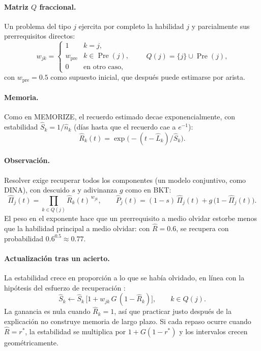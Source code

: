 \documentclass[runningheads]{llncs}
\newcommand{\Pre}{\operatorname{Pre}}
\newcommand{\Rh}{\hat R}
\newcommand{\Sh}{\hat S}
\newcommand{\Lh}{\hat L}
\newcommand{\Pih}{\hat\Pi}
\newcommand{\rstar}{r^{\ast}}
\begin{document}
\paragraph{Matriz $Q$ fraccional.} Un problema del tipo $j$ ejercita por completo la habilidad $j$ y parcialmente sus prerrequisitos directos:
\begin{equation}
w_{jk}=\begin{cases}1 & k=j,\\ w_{\mathrm{pre}} & k\in\Pre(j),\\ 0 & \text{en otro caso,}\end{cases}
\qquad Q(j)=\{j\}\cup\Pre(j),
\label{eq:w}
\end{equation}
con $w_{\mathrm{pre}}=0.5$ como supuesto inicial, que después puede estimarse por arista.

\paragraph{Memoria.} Como en MEMORIZE, el recuerdo estimado decae exponencialmente, con estabilidad $\Sh_k=1/\hat n_k$ (días hasta que el recuerdo cae a $e^{-1}$):
\begin{equation}
\Rh_k(t)=\exp\bigl(-(t-\Lh_k)/\Sh_k\bigr).
\label{eq:mem}
\end{equation}

\paragraph{Observación.} Resolver exige recuperar todos los componentes (un modelo conjuntivo, como DINA), con descuido $s$ y adivinanza $g$ como en BKT:
\begin{equation}
\Pih_j(t)=\prod_{k\in Q(j)}\Rh_k(t)^{\,w_{jk}},\qquad
\hat P_j(t)=(1-s)\,\Pih_j(t)+g\,\bigl(1-\Pih_j(t)\bigr).
\label{eq:obs}
\end{equation}
El peso en el exponente hace que un prerrequisito a medio olvidar estorbe menos que la habilidad principal a medio olvidar: con $\Rh=0.6$, se recupera con probabilidad $0.6^{0.5}\approx0.77$.

\paragraph{Actualización tras un acierto.} La estabilidad crece en proporción a lo que se había olvidado, en línea con la hipótesis del esfuerzo de recuperación \cite{pyc2009}:
\begin{equation}
\Sh_k\leftarrow\Sh_k\,\bigl[1+w_{jk}\,G\,(1-\Rh_k)\bigr],\qquad k\in Q(j).
\label{eq:acierto}
\end{equation}
La ganancia es nula cuando $\Rh_k=1$, así que practicar justo después de la explicación no construye memoria de largo plazo. Si cada repaso ocurre cuando $\Rh=\rstar$, la estabilidad se multiplica por $1+G(1-\rstar)$ y los intervalos crecen geométricamente.
\end{document}
